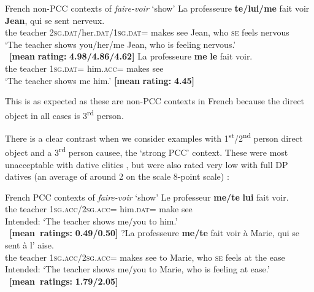\documentclass[output=paper,colorlinks,citecolor=brown,nonflat]{langsci/langscibook}
\begin{document}
\ea%
    \label{ex:sheehan:24}
    French non-PCC contexts of \textit{faire-voir} ‘show’
    \ea\label{ex:sheehan:24a}
    \gll    La professeure \textbf{te/lui/me}  fait voir \textbf{Jean},  qui   se   sent   nerveux.\\
            the   teacher   2\textsc{sg}.\textsc{dat}/her.\textsc{dat}/\textsc{1sg}.\textsc{dat}= makes see   Jean,   who \textsc{se}   feels   nervous\\
    \glt    ‘The teacher shows you/her/me Jean, who is feeling nervous.’\\
            ~\hfill \textbf{[mean} \textbf{rating:} \textbf{4.98/4.86/4.62]}
    \ex\label{ex:sheehan:24b}
    \gll    La   professeure   \textbf{me}   \textbf{le}  fait  voir.\\
            the   teacher  \textsc{1sg}.\textsc{dat=} him.\textsc{acc=}  makes  see\\
    \glt     ‘The teacher shows me him.’ \hfill  \textbf{[mean} \textbf{rating:} \textbf{4.45]}
    \z
\z

This is as expected as these are non-PCC contexts in French because the direct object in all cases is 3\textsuperscript{rd} person.

There is a clear contrast when we consider examples with 1\textsuperscript{st}/2\textsuperscript{nd} person direct object and a 3\textsuperscript{rd} person causee, the ‘strong PCC’ context. These were most unacceptable with dative clitics , but were also rated very low with full DP datives (an average of around 2 on the scale 8-point scale) :

\ea%
    \label{ex:sheehan:25}
    French PCC contexts of \textit{faire-voir} ‘show’
    \ea\label{ex:sheehan:25a}
    \gll    *Le professeur  \textbf{me/te}       \textbf{lui}   fait   voir.\\
            the   teacher  \textsc{1sg}.\textsc{acc/}2\textsc{sg}.\textsc{acc}=  him.\textsc{dat}=  make see\\
    \glt    Intended: ‘The teacher shows me/you to him.’\\
            ~\hfill \textbf{[mean~ratings:} \textbf{0.49/0.50]}
    \ex\label{ex:sheehan:25b}
    \gll    *?La   professeure   \textbf{me/te}       fait     voir à   Marie,  qui   se  sent   à   l’  aise. \\
            the     teacher     \textsc{1sg}.\textsc{acc/}2\textsc{sg}.\textsc{acc}= makes   see to Marie, who \textsc{se}   feels   at   the ease\\
    \glt    Intended: ‘The teacher shows me/you to Marie, who is feeling at ease.’%
            ~\hfill \textbf{[mean~ratings:} \textbf{1.79/2.05]}
    \z
\z
\end{document}

